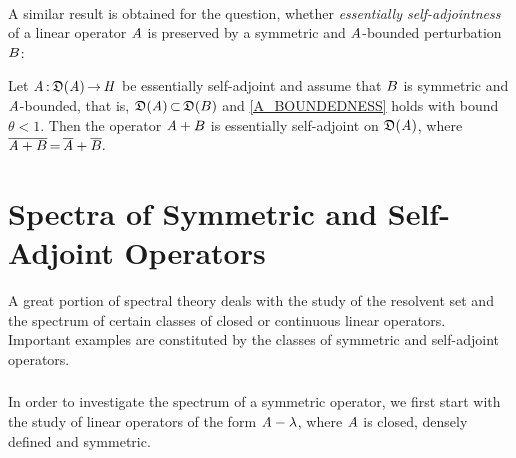 \documentclass[11pt,twoside]{article}
\begin{document}
\paragraph*{}
A similar result is obtained for the question,
whether \textit{essentially self-adjointness} of a linear operator $\mathit{A}$
is preserved by a symmetric and $\mathit{A}$-bounded perturbation ${B}$:

\begin{theorem}\label{KATO-RELLICH_THEOREM_II}
Let $\mathit{A} {\,:\,} \mathfrak{D}(\mathit{A}) {\,\to\,} \mathit{H}$ be essentially self-adjoint
and assume that ${B}$ is symmetric and $\mathit{A}$-bounded,
that is,
$\mathfrak{D}(\mathit{A}) {\,\subset\,} \mathfrak{D}({B})$ and \eqref{A_BOUNDEDNESS} holds
with bound $\theta < 1$.
Then the operator $\mathit{A} + {B}$
is essentially self-adjoint on $\mathfrak{D}(\mathit{A})$, where
$
\overline{\mathit{A} + {B}} {\,=\,} \overline{\mathit{A}} + \overline{{B}}.
$
\end{theorem}

\section{Spectra of Symmetric and Self-Adjoint Operators}
A great portion of spectral theory deals with the study of the
resolvent set and the spectrum of certain classes
of closed or continuous linear operators.
Important examples are constituted by the classes of
symmetric and self-adjoint operators.

\subsubsection*{} %
In order to investigate the spectrum of a symmetric operator,
we first start with the study of linear operators
of the form $\mathit{A} - \lambda$,
where $\mathit{A}$ is closed, densely defined and symmetric.
\end{document}
